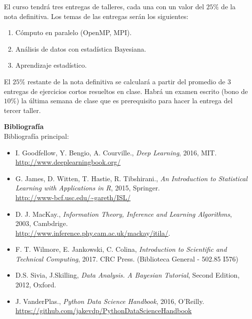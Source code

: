 \documentclass[letterpaper,10pt,onecolumn]{article}
\begin{document}
El curso tendr\'a tres entregas de talleres, cada una con un valor
del $25\%$ de la nota definitiva. Los temas de las entregas ser\'an
los siguientes:
\begin{enumerate}
\item C\'omputo en paralelo (OpenMP, MPI).\\[-0.6cm]
\item An\'alisis de datos con estad\'istica Bayesiana. \\[-0.6cm]
\item Aprendizaje estad\'istico. \\[-0.2cm]
\end{enumerate}
\noindent
El $25\%$ restante de la nota definitiva se calcular\'a a partir del
promedio de $3$ entregas de ejercicios cortos resueltos en clase. 
Habr\'a un examen escrito (bono de $10\%$) la \'ultima semana de clase que es
prerequisito para hacer la entrega del tercer taller.  

\newpage
{}
\noindent\textbf{\large {} \quad
  Bibliograf\'ia}\\[-0.2cm] 


\noindent\normalsize Bibliograf\'ia principal:

\begin{itemize}
\item I. Goodfellow, Y. Bengio, A. Courville., \textit{Deep Learning}, 
  2016, MIT.\\
  \url{http://www.deeplearningbook.org/}
  \\[-0.6cm] 
\item G. James, D. Witten, T. Hastie, R. Tibshirani., \textit{An
  Introduction to Statistical Learning with Applications in R}, 2015,
  Springer. \\
  \url{http://www-bcf.usc.edu/~gareth/ISL/} \\[-0.6cm] 
\item D. J. MacKay., \textit{Information Theory, Inference and
  Learning Algorithms}, 2003,
  Cambdrige. \\
  \url{http://www.inference.phy.cam.ac.uk/mackay/itila/}.
  \\[-0.6cm]  
\item F. T. Wilmore, E. Jankowski, C. Colina, \textit{Introduction
  to Scientific and Technical Computing}, 2017. CRC Press. (Biblioteca
  General - 502.85 I576)\\[-0.6cm] 
\item D.S. Sivia, J.Skilling, \textit{Data Analysis. A Bayesian Tutorial}, Second Edition, 2012, Oxford.\\[-0.6cm]
\item J. VanderPlas., \textit{Python Data Science Handbook}, 2016,
  O'Reilly.\\
  \url{https://github.com/jakevdp/PythonDataScienceHandbook} 
  \\[-0.2cm] 

\end{itemize} 
\end{document}
